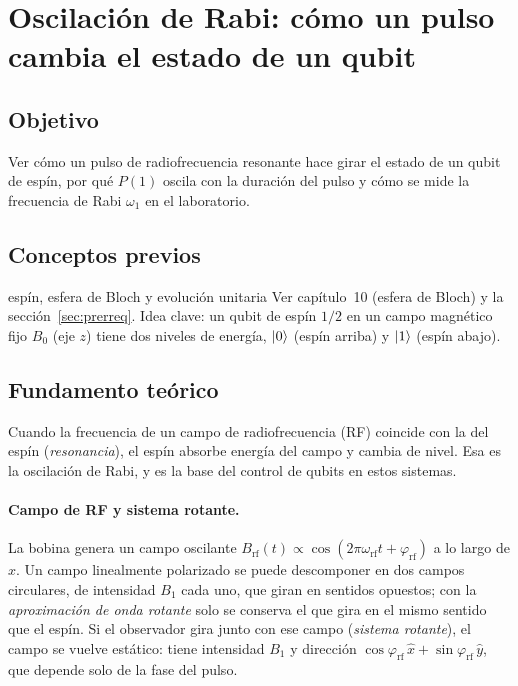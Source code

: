 \def\tituloconcepto{Oscilación de Rabi}


\section{Oscilación de Rabi: cómo un pulso cambia el estado de un qubit}

\subsection{Objetivo}
Ver cómo un pulso de radiofrecuencia resonante hace girar el estado de un qubit
de espín, por qué $P(1)$ oscila con la duración del pulso y cómo se mide la
frecuencia de Rabi $\omega_1$ en el laboratorio.

\subsection{Conceptos previos}
\begin{concepto}{espín, esfera de Bloch y evolución unitaria}
Ver capítulo~10 (esfera de Bloch) y la sección~\ref{sec:prerreq}. Idea
clave: un qubit de espín $1/2$ en un campo magnético fijo $B_0$ (eje $z$) tiene
dos niveles de energía, $\left|0\right\rangle$ (espín arriba) y $\left|1\right\rangle$ (espín abajo).
\end{concepto}

\subsection{Fundamento teórico}
Cuando la frecuencia de un campo de radiofrecuencia (RF) coincide con la del
espín (\emph{resonancia}), el espín absorbe energía del campo y cambia de
nivel. Esa es la oscilación de Rabi, y es la base del control de qubits en
estos sistemas.

\paragraph{Campo de RF y sistema rotante.} La bobina genera un campo oscilante
$B_{\mathrm{rf}}(t)\propto\cos(2\pi\omega_{\mathrm{rf}}t+\varphi_{\mathrm{rf}})$
a lo largo de $x$. Un campo linealmente polarizado se puede descomponer en dos
campos circulares, de intensidad $B_1$ cada uno, que giran en sentidos opuestos; con la \emph{aproximación de onda rotante} solo se
conserva el que gira en el mismo sentido que el espín. Si el observador gira
junto con ese campo (\emph{sistema rotante}), el campo se vuelve estático: tiene
intensidad $B_1$ y dirección
$\cos\varphi_{\mathrm{rf}}\,\hat x+\sin\varphi_{\mathrm{rf}}\,\hat y$, que
depende solo de la fase del pulso.

